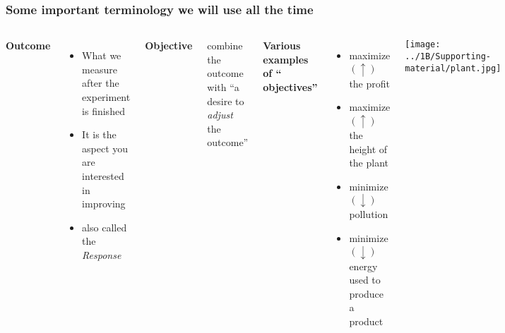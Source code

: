 \documentclass[11pt,aspectratio=169,mathserif]{beamer}
\begin{document}
\begin{frame}\frametitle{Some important terminology we will use all the time}

	\begin{columns}[T]
			\textbf{{\color{purple} Outcome}}
				\begin{itemize}
					\item	What we measure after the experiment is finished  \pause
					\item	It is the aspect you are interested in improving  
					\item	also called the \emph{Response}

				\end{itemize}
			
			\pause
			\vspace{12pt}	
			\textbf{{\color{purple} Objective}}
			
				\vspace{1pt}	
				\qquad combine the {\color{purple} outcome} with ``a desire to \emph{adjust} the outcome''
				
				
			\pause
			\vspace{12pt}
			
			{\textbf{{Various examples of ``{\color{purple} objectives}''}}}

				\begin{itemize}
					\item	maximize $(\uparrow)$ the profit
					\item	maximize $(\uparrow)$ the height of the plant
					\item	minimize $(\downarrow)$ pollution
					\item	minimize $(\downarrow)$ energy used to produce a product
				\end{itemize}
			
			
			\centerline{\texttt{[image: ../1B/Supporting-material/plant.jpg]}}
	\end{columns}


\end{frame}
\end{document}

